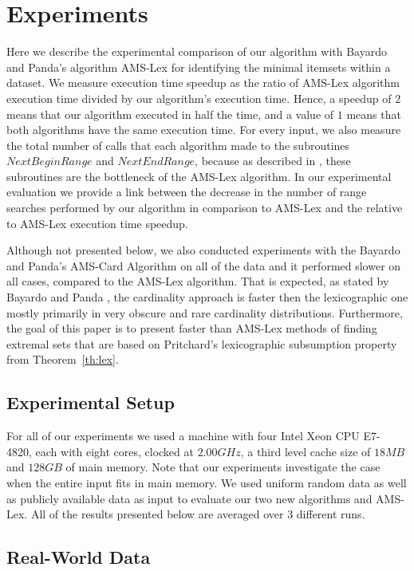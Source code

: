 \documentclass[13pt,a4paper]{article}
\begin{document}
\section{Experiments}
\label{sec:experiments}

Here we describe the experimental comparison of our algorithm with Bayardo and Panda's algorithm AMS-Lex for identifying the minimal itemsets within a dataset. We measure execution time speedup as the ratio of AMS-Lex algorithm execution time divided by our algorithm's execution time. Hence, a speedup of $2$ means that our algorithm executed in half the time, and a value of $1$ means that both algorithms have the same execution time. For every input, we also measure the total number of calls that each algorithm made to the subroutines $NextBeginRange$ and $NextEndRange$, because as described in \cite{BayardoPanda11}, these subroutines are the bottleneck of the AMS-Lex algorithm. In our experimental evaluation we provide a link between the decrease in the number of range searches performed by our algorithm in comparison to AMS-Lex and the relative to AMS-Lex execution time speedup.

Although not presented below, we also conducted experiments with the Bayardo and Panda's AMS-Card Algorithm on all of the data and it performed slower on all cases, compared to the AMS-Lex algorithm. That is expected, as stated by Bayardo and Panda \cite{BayardoPanda11}, the cardinality approach is faster then the lexicographic one mostly primarily in very obscure and rare cardinality distributions. Furthermore, the goal of this paper is to present faster than AMS-Lex methods of finding extremal sets that are based on Pritchard's lexicographic subsumption property from Theorem~\ref{th:lex}.

\subsection{Experimental Setup}
For all of our experiments we used a machine with four Intel Xeon CPU E7- 4820, each with eight cores, clocked at $2.00GHz$, a third level cache size of $18MB$ and $128GB$ of main memory. Note that our experiments investigate the case when the entire input fits in main memory. We used uniform random data as well as publicly available data as input to evaluate our two new algorithms and AMS-Lex. All of the results presented below are averaged over $3$ different runs.


\subsection{Real-World Data}
\end{document}
